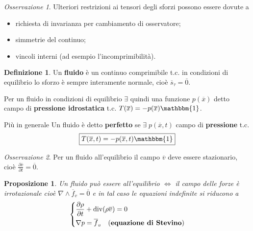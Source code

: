 \documentclass{book}
\theoremstyle{plain}
\theoremstyle{plain}
\theoremstyle{plain}
\theoremstyle{plain}
\theoremstyle{plain}
\newtheorem{prop}{Proposizione}[chapter]
\theoremstyle{definition}
\newtheorem{defi}{Definizione}[chapter]
\theoremstyle{remark}
\newtheorem*{oss}{Osservazione}
\theoremstyle{definition}
\begin{document}
\begin{oss}
    Ulteriori restrizioni ai tensori degli sforzi possono essere dovute a
    \begin{itemize}
        \item richiesta di invarianza per cambiamento di osservatore;
        \item  simmetrie del continuo;
        \item vincoli interni (ad esempio l'incomprimibilità).
    \end{itemize}
\end{oss}

\begin{defi}
    Un \textbf{fluido} è un continuo comprimibile t.c. in condizioni di equilibrio lo sforzo è sempre interamente normale, cioè $\overline{s}_{\tau}=\overline{0}$.
    
    \noindent Per un fluido in condizioni di equilibrio $\exists$ quindi una funzione $p(\overline{x})$ detto campo di \textbf{pressione idrostatica} t.c. $T(\overline{x})=-p(\overline{x})\mathbbm{1}$. 
    
    \noindent Più in generale Un fluido è detto \textbf{perfetto} se $\exists \;p(\overline{x},t)$ campo di \textbf{pressione} t.c.
    \begin{displaymath}
    \boxed{
        T(\overline{x},t)=-p(\overline{x},t)\mathbbm{1}
        }
    \end{displaymath}
\end{defi}

\begin{oss}
    Per un fluido all'equilibrio il campo $\overline{v}$ deve essere stazionario, cioè $\frac{\partial \overline{v}}{\partial t}=\overline{0}$.
\end{oss}

\begin{prop}
    Un fluido può essere all'equilibrio $\iff$ il campo delle forze è irrotazionale cioè $\nabla \wedge \overline{f}_v=\overline{0}$ e in tal caso le equazioni indefinite si riducono a
    \begin{displaymath}
        \begin{dcases}
            \frac{\partial \rho}{\partial t}+\operatorname{div}(\rho\overline{v})=0 \\
            \nabla p=\overline{f}_v \quad (\textbf{equazione di Stevino})
        \end{dcases}
    \end{displaymath}
\end{prop}
\end{document}
